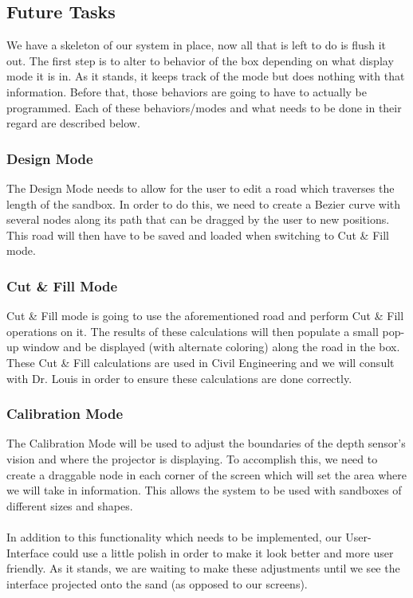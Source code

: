 \documentclass[onecolumn, draftclsnofoot,10pt, compsoc]{IEEEtran}
\begin{document}
\subsection{Future Tasks}
We have a skeleton of our system in place, now all that is left to do is flush it out.  The first step is to alter to behavior of the box depending on what display mode it is in.  As it stands, it keeps track of the mode but does nothing with that information.  Before that, those behaviors are going to have to actually be programmed.  Each of these behaviors/modes and what needs to be done in their regard are described below.  

\subsubsection{Design Mode}
The Design Mode needs to allow for the user to edit a road which traverses the length of the sandbox.  In order to do this, we need to create a Bezier curve with several nodes along its path that can be dragged by the user to new positions.  This road will then have to be saved and loaded when switching to Cut \& Fill mode.
\subsubsection{Cut \& Fill Mode}
Cut \& Fill mode is going to use the aforementioned road and perform Cut \& Fill operations on it.  The results of these calculations will then populate a small pop-up window and be displayed (with alternate coloring) along the road in the box.  These Cut \& Fill calculations are used in Civil Engineering and we will consult with Dr. Louis  in order to ensure these calculations are done correctly.
\subsubsection{Calibration Mode}
The Calibration Mode will be used to adjust the boundaries of the depth sensor's vision and where the projector is displaying.  To accomplish this, we need to create a draggable node in each corner of the screen which will set the area where we will take in information.  This allows the system to be used with sandboxes of different sizes and shapes.
\\\\
In addition to this functionality which needs to be implemented, our User-Interface could use a little polish in order to make it look better and more user friendly.  As it stands, we are waiting to make these adjustments until we see the interface projected onto the sand (as opposed to our screens).
\end{document}
